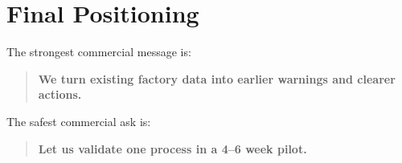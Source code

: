 \documentclass[11pt,a4paper]{article}
\begin{document}
\section{Final Positioning}
The strongest commercial message is:
\begin{quote}
\textbf{We turn existing factory data into earlier warnings and clearer actions.}
\end{quote}

The safest commercial ask is:
\begin{quote}
\textbf{Let us validate one process in a 4--6 week pilot.}
\end{quote}
\end{document}
